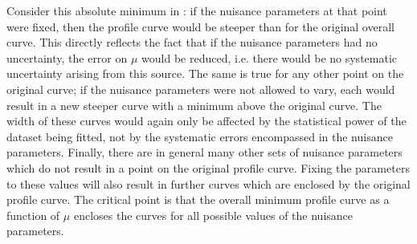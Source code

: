 Consider this absolute minimum in \nll: if the nuisance parameters at that
point were fixed, then the \nll profile curve would be steeper than for
the original overall \nll curve. This directly reflects the fact that
if the nuisance parameters had no uncertainty,
the error on $\mu$ would be reduced, i.e. there would be no systematic 
uncertainty arising from this source.
The same is true for any other point on the original curve; if the nuisance
parameters were not allowed to vary, each would result in a new steeper curve
with a minimum above the original curve.
The width of these curves would again only be affected by the statistical
power of the dataset being fitted, not by the systematic errors encompassed
in the nuisance parameters.
Finally, there are in general
many other sets of nuisance parameters which do not result in a point on the
original profile curve. Fixing the parameters to these values will also result
in further curves which are enclosed by the original profile curve.
The critical point is that the overall \nll minimum profile curve as a function
of $\mu$ encloses the curves for all possible values of the nuisance
parameters.

